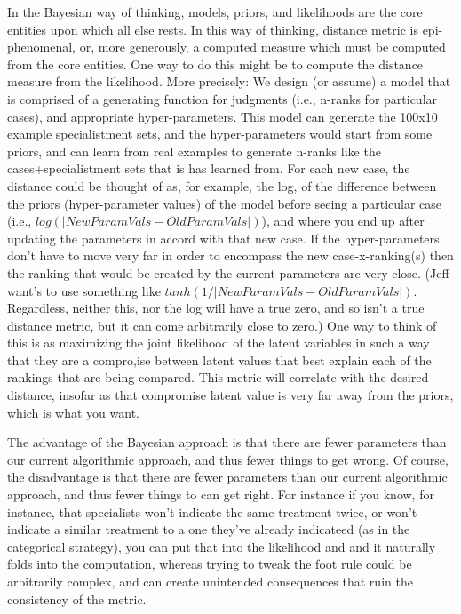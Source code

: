 \documentclass{article}
\begin{document}
In the Bayesian way of thinking, models, priors, and likelihoods are the core entities upon which all else rests. In this way of thinking, distance metric is epi-phenomenal, or, more generously, a computed measure which must be computed from the core entities. One way to do this might be to compute the distance measure from the likelihood. More precisely: We design (or assume) a model that is comprised of a generating function for judgments (i.e., n-ranks for particular cases), and appropriate hyper-parameters. This model can generate the 100x10 example specialistment sets, and the hyper-parameters would start from some priors, and can learn from real examples to generate n-ranks like the cases+specialistment sets that is has learned from. For each new case, the distance could be thought of as, for example, the log, of the difference between the priors (hyper-parameter values) of the model before seeing a particular case (i.e., $log(|NewParamVals-OldParamVals|)$), and where you end up after updating the parameters in accord with that new case. If the hyper-parameters don't have to move very far in order to encompass the new case-x-ranking(s) then the ranking that would be created by the current parameters are very close. (Jeff want's to use something like $tanh(1/|NewParamVals-OldParamVals|)$. Regardless, neither this, nor the log will have a true zero, and so isn't a true distance metric, but it can come arbitrarily close to zero.) One way to think of this is as maximizing the joint likelihood of the latent variables in such a way that they are a compro,ise between latent values that best explain each of the rankings that are being compared. This metric will correlate with the desired distance, insofar as that compromise latent value is very far away from the priors, which is what you want. 

The advantage of the Bayesian approach is that there are fewer parameters than our current algorithmic approach, and thus fewer things to get wrong. Of course, the disadvantage is that there are fewer parameters than our current algorithmic approach, and thus fewer things to can get right. For instance if you know, for instance, that specialists won't indicate the same treatment twice, or won't indicate a similar treatment to a one they've already indicateed (as in the categorical strategy), you can put that into the likelihood and and it naturally folds into the computation, whereas trying to tweak the foot rule could be arbitrarily complex, and can create unintended consequences that ruin the consistency of the metric.
\end{document}
